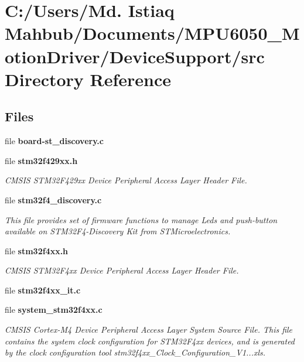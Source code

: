 \section{C\+:/\+Users/\+Md. Istiaq Mahbub/\+Documents/\+M\+P\+U6050\+\_\+\+Motion\+Driver/\+Device\+Support/src Directory Reference}
\label{dir_9a95891fbd088ed7c6fbc0c745ec7730}
\subsection*{Files}
\begin{DoxyCompactItemize}
\item 
file \textbf{ board-\/st\+\_\+discovery.\+c}
\item 
file \textbf{ stm32f429xx.\+h}
\begin{DoxyCompactList}\small\item\em C\+M\+S\+IS S\+T\+M32\+F429xx Device Peripheral Access Layer Header File. \end{DoxyCompactList}\item 
file \textbf{ stm32f4\+\_\+discovery.\+c}
\begin{DoxyCompactList}\small\item\em This file provides set of firmware functions to manage Leds and push-\/button available on S\+T\+M32\+F4-\/\+Discovery Kit from S\+T\+Microelectronics. \end{DoxyCompactList}\item 
file \textbf{ stm32f4xx.\+h}
\begin{DoxyCompactList}\small\item\em C\+M\+S\+IS S\+T\+M32\+F4xx Device Peripheral Access Layer Header File. \end{DoxyCompactList}\item 
file \textbf{ stm32f4xx\+\_\+it.\+c}
\item 
file \textbf{ system\+\_\+stm32f4xx.\+c}
\begin{DoxyCompactList}\small\item\em C\+M\+S\+IS Cortex-\/\+M4 Device Peripheral Access Layer System Source File. This file contains the system clock configuration for S\+T\+M32\+F4xx devices, and is generated by the clock configuration tool stm32f4xx\+\_\+\+Clock\+\_\+\+Configuration\+\_\+\+V1...\+xls. \end{DoxyCompactList}\end{DoxyCompactItemize}
